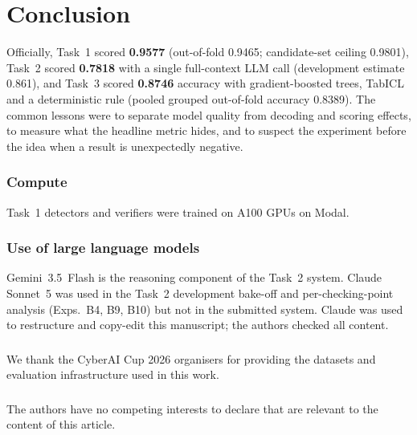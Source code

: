 \documentclass[runningheads]{llncs}
\begin{document}





\section{Conclusion}
\label{sec:conclusion}

Officially, Task~1 scored \textbf{0.9577} (out-of-fold 0.9465; candidate-set ceiling
0.9801), Task~2 scored \textbf{0.7818} with a single full-context LLM call (development
estimate 0.861), and Task~3 scored \textbf{0.8746} accuracy with gradient-boosted
trees, TabICL and a deterministic rule (pooled grouped out-of-fold accuracy 0.8389). The common
lessons were to separate model quality from decoding and scoring effects, to measure
what the headline metric hides, and to suspect the experiment before the idea when a
result is unexpectedly negative.

\begin{credits}

\subsubsection{Compute}
Task~1 detectors and verifiers were trained on A100 GPUs on Modal.

\subsubsection{Use of large language models}
Gemini~3.5~Flash is the reasoning component of the Task~2 system. Claude Sonnet~5 was used in the Task~2 development bake-off and per-checking-point analysis (Exps.~B4, B9, B10) but not in the submitted system. Claude was used to restructure and copy-edit this manuscript; the authors checked all content.

\subsubsection{\ackname}
We thank the CyberAI Cup 2026 organisers for providing the datasets and evaluation infrastructure used in this work.

\subsubsection{\discintname}
The authors have no competing interests to declare that are relevant to the content of this article.

\end{credits}
\end{document}
